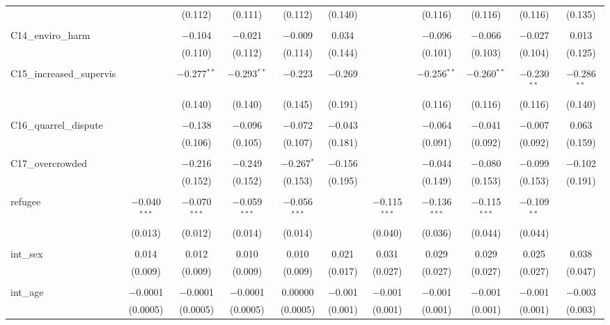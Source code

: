 \begin{table}[H]
\begin{tabular}{@{\extracolsep{4pt}}lcccccccccc}
  &  & (0.112) & (0.111) & (0.112) & (0.140) &  & (0.116) & (0.116) & (0.116) & (0.135) \\ 
  & & & & & & & & & & \\ 
 C14\_enviro\_harm &  & $-$0.104 & $-$0.021 & $-$0.009 & 0.034 &  & $-$0.096 & $-$0.066 & $-$0.027 & 0.013 \\ 
  &  & (0.110) & (0.112) & (0.114) & (0.144) &  & (0.101) & (0.103) & (0.104) & (0.125) \\ 
  & & & & & & & & & & \\ 
 C15\_increased\_supervis &  & $-$0.277$^{**}$ & $-$0.293$^{**}$ & $-$0.223 & $-$0.269 &  & $-$0.256$^{**}$ & $-$0.260$^{**}$ & $-$0.230$^{**}$ & $-$0.286$^{**}$ \\ 
  &  & (0.140) & (0.140) & (0.145) & (0.191) &  & (0.116) & (0.116) & (0.116) & (0.140) \\ 
  & & & & & & & & & & \\ 
 C16\_quarrel\_dispute &  & $-$0.138 & $-$0.096 & $-$0.072 & $-$0.043 &  & $-$0.064 & $-$0.041 & $-$0.007 & 0.063 \\ 
  &  & (0.106) & (0.105) & (0.107) & (0.181) &  & (0.091) & (0.092) & (0.092) & (0.159) \\ 
  & & & & & & & & & & \\ 
 C17\_overcrowded &  & $-$0.216 & $-$0.249 & $-$0.267$^{*}$ & $-$0.156 &  & $-$0.044 & $-$0.080 & $-$0.099 & $-$0.102 \\ 
  &  & (0.152) & (0.152) & (0.153) & (0.195) &  & (0.149) & (0.153) & (0.153) & (0.191) \\ 
  & & & & & & & & & & \\ 
 refugee & $-$0.040$^{***}$ & $-$0.070$^{***}$ & $-$0.059$^{***}$ & $-$0.056$^{***}$ &  & $-$0.115$^{***}$ & $-$0.136$^{***}$ & $-$0.115$^{***}$ & $-$0.109$^{**}$ &  \\ 
  & (0.013) & (0.012) & (0.014) & (0.014) &  & (0.040) & (0.036) & (0.044) & (0.044) &  \\ 
  & & & & & & & & & & \\ 
 int\_sex & 0.014 & 0.012 & 0.010 & 0.010 & 0.021 & 0.031 & 0.029 & 0.029 & 0.025 & 0.038 \\ 
  & (0.009) & (0.009) & (0.009) & (0.009) & (0.017) & (0.027) & (0.027) & (0.027) & (0.027) & (0.047) \\ 
  & & & & & & & & & & \\ 
 int\_age & $-$0.0001 & $-$0.0001 & $-$0.0001 & 0.00000 & $-$0.001 & $-$0.001 & $-$0.001 & $-$0.001 & $-$0.001 & $-$0.003 \\ 
  & (0.0005) & (0.0005) & (0.0005) & (0.0005) & (0.001) & (0.001) & (0.001) & (0.001) & (0.001) & (0.003) \\ 

\end{tabular}
\end{table}
